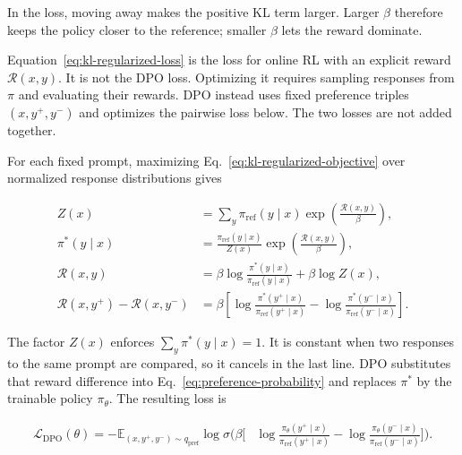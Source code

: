 \documentclass[11pt]{article}
\newcommand{\E}{\mathbb{E}}
\begin{document}
In the loss, moving away makes the positive KL term larger.  Larger \(\beta\)
therefore keeps the policy closer to the reference; smaller \(\beta\) lets the
reward dominate.

Equation~\eqref{eq:kl-regularized-loss} is the loss for online RL with an
explicit reward \(\mathcal R(x,y)\).  It is not the DPO loss.  Optimizing it
requires sampling responses from \(\pi\) and evaluating their rewards.  DPO
instead uses fixed preference triples \((x,y^+,y^-)\) and optimizes the
pairwise loss below.  The two losses are not added together.

For each fixed prompt, maximizing Eq.~\eqref{eq:kl-regularized-objective}
over normalized response distributions gives

\begin{equation}
    \begin{split}
    Z(x)
      &=\sum_y\pi_{\mathrm{ref}}(y\mid x)
        \exp\!\left(\frac{\mathcal R(x,y)}{\beta}\right),\\
    \pi^*(y\mid x)
      &=\frac{\pi_{\mathrm{ref}}(y\mid x)}{Z(x)}
        \exp\!\left(\frac{\mathcal R(x,y)}{\beta}\right),\\
    \mathcal R(x,y)
      &=\beta\log
        \frac{\pi^*(y\mid x)}{\pi_{\mathrm{ref}}(y\mid x)}
        +\beta\log Z(x),\\
    \mathcal R(x,y^+)-\mathcal R(x,y^-)
      &=\beta\left[
        \log\frac{\pi^*(y^+\mid x)}{\pi_{\mathrm{ref}}(y^+\mid x)}
        -\log\frac{\pi^*(y^-\mid x)}{\pi_{\mathrm{ref}}(y^-\mid x)}
        \right].
    \end{split}
    \label{eq:dpo-policy-reward}
\end{equation}

The factor \(Z(x)\) enforces \(\sum_y\pi^*(y\mid x)=1\).  It is constant when
two responses to the same prompt are compared, so it cancels in the last line.
DPO substitutes that reward difference into
Eq.~\eqref{eq:preference-probability} and replaces \(\pi^*\) by the trainable
policy \(\pi_\theta\).  The resulting loss is

\begin{equation}
    \begin{split}
    \mathcal L_{\mathrm{DPO}}(\theta)
      =-\E_{(x,y^+,y^-)\sim q_{\mathrm{pref}}}
      \log\sigma\!\Bigg(
      \beta\Bigg[
      &\log\frac{\pi_\theta(y^+\mid x)}
                     {\pi_{\mathrm{ref}}(y^+\mid x)}
      -
      \log\frac{\pi_\theta(y^-\mid x)}
                     {\pi_{\mathrm{ref}}(y^-\mid x)}
      \Bigg]\Bigg).
    \end{split}
    \label{eq:dpo-loss}
\end{equation}
\end{document}
